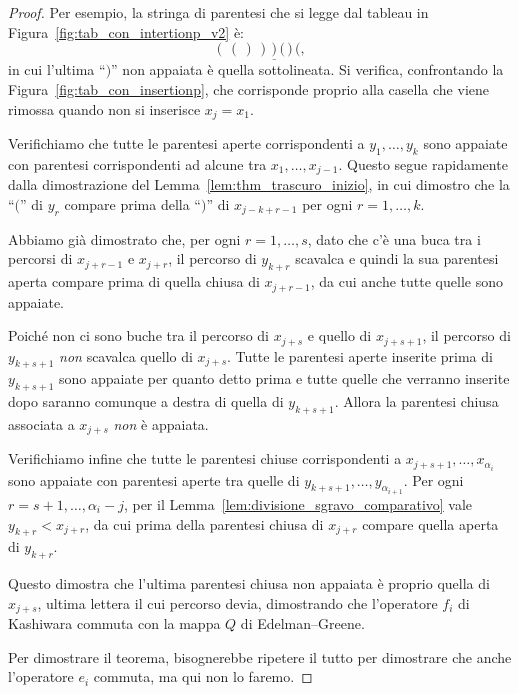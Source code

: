 \begin{proof}
    Per esempio, la stringa di parentesi che si legge dal tableau in
    Figura~\ref{fig:tab_con_intertionp_v2} \`e:
    \[
        (\,(\,)\,)\,\underline{)}\,\lparen\,)\,\lparen,
    \]
    in cui l'ultima ``$)$'' non appaiata \`e quella sottolineata.
    Si verifica, confrontando la Figura~\ref{fig:tab_con_insertionp}, che corrisponde
    proprio alla casella che viene rimossa quando non si inserisce $x_j = x_1$.


    Verifichiamo che tutte le parentesi aperte corrispondenti a $y_1, \dots, y_k$
    sono appaiate con parentesi corrispondenti ad alcune tra $x_1, \dots, x_{j-1}$.
    Questo segue rapidamente dalla dimostrazione del Lemma~\ref{lem:thm_trascuro_inizio},
    in cui dimostro che la ``$\lparen$'' di $y_{r}$ compare prima della
    ``$)$'' di $x_{j-k+r-1}$ per ogni $r = 1, \dots , k$.

    Abbiamo gi\`a dimostrato che, per ogni $r = 1, \dots, s$, dato
    che c'\`e una buca tra i percorsi di $x_{j+r-1}$ e $x_{j+r}$, il percorso
    di $y_{k+r}$ scavalca e quindi la sua parentesi aperta compare prima di quella
    chiusa di $x_{j+r-1}$, da cui anche tutte quelle sono appaiate.

    Poich\'e non ci sono buche tra il percorso di $x_{j+s}$ e quello di
    $x_{j+s+1}$, il percorso di $y_{k+s+1}$ \emph{non} scavalca quello di $x_{j+s}$.
    Tutte le parentesi aperte inserite prima di $y_{k+s+1}$ sono appaiate per quanto
    detto prima e tutte quelle che verranno inserite dopo saranno comunque a destra
    di quella di $y_{k+s+1}$.
    Allora la parentesi chiusa associata a $x_{j+s}$ \emph{non} \`e appaiata.

    Verifichiamo infine che tutte le parentesi chiuse corrispondenti a
    $x_{j+s+1}, \dots, x_{\alpha_i}$ sono appaiate con parentesi aperte tra quelle
    di $y_{k+s+1}, \dots, y_{\alpha_{i+1}}$.
    Per ogni $r = s+1, \dots, \alpha_i - j$, per il Lemma~\ref{lem:divisione_sgravo_comparativo}
    vale $ y_{k+r} < x_{j+r} $, da cui prima della parentesi chiusa di $x_{j+r}$
    compare quella aperta di $y_{k+r}$.

    Questo dimostra che l'ultima parentesi chiusa non appaiata \`e proprio quella
    di $x_{j+s}$, ultima lettera il cui percorso devia,
    dimostrando che l'operatore $f_i$ di Kashiwara commuta con
    la mappa $Q$ di Edelman--Greene.

    Per dimostrare il teorema, bisognerebbe ripetere il tutto per dimostrare
    che anche l'operatore $e_i$ commuta, ma qui non lo faremo.
\end{proof}


